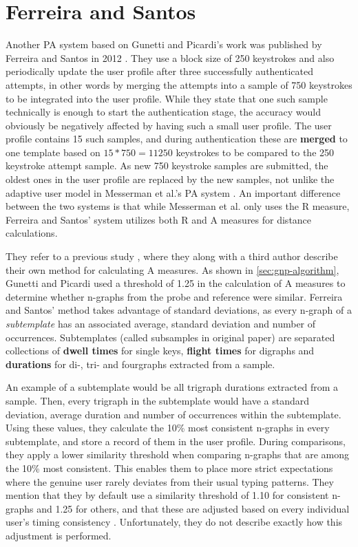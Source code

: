 \documentclass[informationsecurity]{gucmasterproject}
\begin{document}
\chapter{Ferreira and Santos}
\label{chap:ferreira}
Another PA system based on Gunetti and Picardi's work was published by Ferreira and Santos in 2012 \cite{superResults}.
They use a block size of 250 keystrokes and also periodically update the user profile after three successfully authenticated attempts, in other words by merging the attempts into a sample of 750 keystrokes to be integrated into the user profile.
While they state that one such sample technically is enough to start the authentication stage, the accuracy would obviously be negatively affected by having such a small user profile.
The user profile contains 15 such samples, and during authentication these are \textbf{merged} to one template based on $15*750 = 11250$ keystrokes to be compared to the 250 keystroke attempt sample. 
As new 750 keystroke samples are submitted, the oldest ones in the user profile are replaced by the new samples, not unlike the adaptive user model in Messerman et al.'s PA system \cite{Messerman}.
An important difference between the two systems is that while Messerman et al. only uses the R measure, Ferreira and Santos' system utilizes both R and A measures for distance calculations.

They refer to a previous study \cite{superOld}, where they along with a third author describe their own method for calculating A measures.
As shown in \cref{sec:gnp-algorithm}, Gunetti and Picardi used a threshold of 1.25 in the calculation of A measures to determine whether n-graphs from the probe and reference were similar.
Ferreira and Santos' method takes advantage of standard deviations, as every n-graph of a \textit{subtemplate} has an associated average, standard deviation and number of occurrences.
Subtemplates (called subsamples in original paper) are separated collections of \textbf{dwell times} for single keys, \textbf{flight times} for digraphs and \textbf{durations} for di-, tri- and fourgraphs extracted from a sample.

An example of a subtemplate would be all trigraph durations extracted from a sample.
Then, every trigraph in the subtemplate would have a standard deviation, average duration and number of occurrences within the subtemplate.
Using these values, they calculate the 10\% most consistent n-graphs in every subtemplate, and store a record of them in the user profile.
During comparisons, they apply a lower similarity threshold when comparing n-graphs that are among the 10\% most consistent.
This enables them to place more strict expectations where the genuine user rarely deviates from their usual typing patterns.
They mention that they by default use a similarity threshold of 1.10 for consistent n-graphs and 1.25 for others, and that these are adjusted based on every individual user's timing consistency \cite{superOld}.
Unfortunately, they do not describe exactly how this adjustment is performed.
\end{document}
